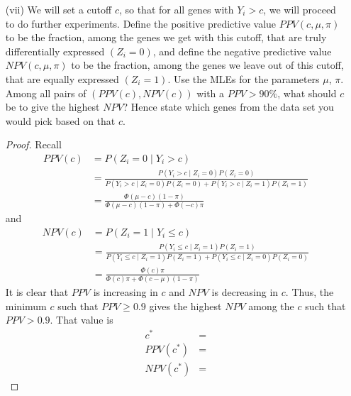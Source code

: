 \documentclass[letterpaper, 12pt]{article}
\begin{document}
\begin{enumerate}
\begin{enumerate}
\begin{proof}
Thus, an approximate 95\% confidence interval for $\log \frac{\pi}{1-\pi}$ is
\[
\left[
\text{logit}\left(\hat{\pi} \right)
-
1.96
\sqrt{
[(-H(\hat{\theta}))^{-1}]_{22}
},\;
\text{logit}\left(\hat{\pi} \right)
+
1.96
\sqrt{
(-H(\hat{\theta}))^{-1}]_{22}
}
\right]
\] 
and applying $h(x)$, a 95\% confidence interval for $1-\pi$ is
\begin{align*}
LB
&=
\left(
1+
\exp\left\{
\text{logit}\left(\hat{\pi} \right)
+
1.96
\sqrt{
[(-H(\hat{\theta}))^{-1}]_{22}
}
\right\}
\right)^{-1}
\\
UB
&=
\left(
1+
\exp\left\{
\text{logit}\left(\hat{\pi} \right)
-
1.96
\sqrt{
[(-H(\hat{\theta}))^{-1}]_{22}
}
\right\}
\right)^{-1}
\end{align*}
where $LB$ and $UB$ are the lower bound and upper bound, respectively.
\end{proof}
\item[(vii)]
We will set a cutoff $c$, so that for all genes with $Y_i > c$, we will proceed to do further experiments. Define the positive predictive value $PPV(c, \mu, \pi)$ to be the fraction, among the genes we get with this cutoff, that are truly differentially expressed $(Z_i = 0)$, and define the negative predictive value $NPV(c, \mu, \pi)$ to be the fraction, among the genes we leave out of this cutoff, that are equally expressed $(Z_i = 1)$.
Use the MLEs for the parameters $\mu$, $\pi$. Among all pairs of $(PPV(c), NPV(c))$ with a $PPV> 90\%$, what should $c$ be to give the highest $NPV$? Hence state which genes from the data set you would pick based on that $c$.
\begin{proof}
Recall
\begin{align*}
PPV(c) &= P(Z_i = 0 \mid Y_i > c)
\\
&=
\frac{P(Y_i > c \mid Z_i = 0) P(Z_i = 0)}{P(Y_i > c \mid Z_i = 0) P(Z_i = 0)+P(Y_i > c \mid Z_i = 1) P(Z_i = 1)}
\\
&=
\frac{\Phi(\mu - c)(1-\pi)}{\Phi(\mu - c)(1-\pi) + \Phi(-c)\pi}
\end{align*}
and
\begin{align*}
NPV(c) &= P(Z_i = 1 \mid Y_i \leq c)
\\
&=
\frac{P(Y_i \leq c \mid Z_i = 1) P(Z_i = 1)}{P(Y_i \leq c \mid Z_i = 1) P(Z_i = 1)+P(Y_i \leq c \mid Z_i = 0) P(Z_i = 0)}
\\
&=
\frac{\Phi(c)\pi}{\Phi(c)\pi+\Phi(c -\mu)(1-\pi)}
\end{align*}
It is clear that $PPV$ is increasing in $c$ and $NPV$ is decreasing in $c$. Thus, the minimum $c$ such that $PPV \geq 0.9$ gives the highest $NPV$ among the $c$ such that $PPV > 0.9$. That value is 
\begin{align*}
c^* 
&=

\\
PPV(c^*)
&=

\\
NPV(c^*)
&=

\end{align*}


\end{proof}
\end{enumerate}
\end{enumerate}
\end{document}
